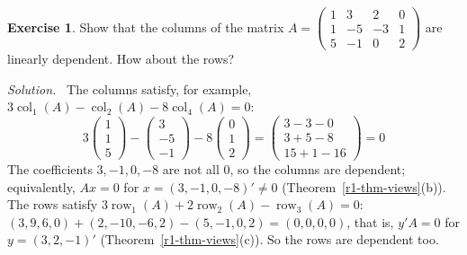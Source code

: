 \documentclass[12pt]{article}
\DeclareMathOperator{\row}{row}
\DeclareMathOperator{\col}{col}
\theoremstyle{definition}
\newtheorem{exercise}{Exercise}
\newenvironment{solution}{\par\noindent\textit{Solution.}\ }{\par\smallskip}
\begin{document}
\begin{exercise}\label{r3-ex-column-row-relations}
Show that the columns of the matrix
\(A=\begin{pmatrix}1&3&2&0\\1&-5&-3&1\\5&-1&0&2\end{pmatrix}\) are linearly dependent. How
about the rows?
\end{exercise}
\begin{solution}
The columns satisfy, for example, \(3\col_1(A)-\col_2(A)-8\col_4(A)=0\):
\[
3\begin{pmatrix}1\\1\\5\end{pmatrix}-\begin{pmatrix}3\\-5\\-1\end{pmatrix}-8\begin{pmatrix}0\\1\\2\end{pmatrix}
=\begin{pmatrix}3-3-0\\3+5-8\\15+1-16\end{pmatrix}=0
\]
The coefficients \(3,-1,0,-8\) are not all \(0\), so the columns are dependent; equivalently,
\(Ax=0\) for \(x=(3,-1,0,-8)'\ne0\) (Theorem~\ref{r1-thm-views}(b)). The rows satisfy
\(3\row_1(A)+2\row_2(A)-\row_3(A)=0\):
\((3,9,6,0)+(2,-10,-6,2)-(5,-1,0,2)=(0,0,0,0)\), that is, \(y'A=0\) for
\(y=(3,2,-1)'\) (Theorem~\ref{r1-thm-views}(c)). So the rows are dependent too.
\end{solution}
\end{document}

